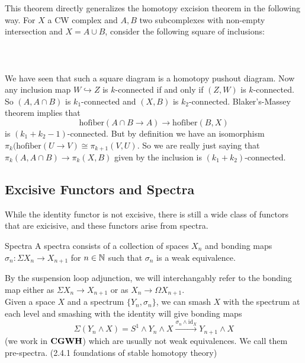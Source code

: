\documentclass[a4paper]{article}
\begin{document}
This theorem directly generalizes the homotopy excision theorem in the following way. For $X$ a CW complex and $A,B$ two subcomplexes with non-empty intersection and $X=A\cup B$, consider the following square of inclusions: \\~\\
\\~\\
We have seen that such a square diagram is a homotopy pushout diagram. Now any inclusion map $W\hookrightarrow Z$ is $k$-connected if and only if $(Z,W)$ is $k$-connected. So $(A,A\cap B)$ is $k_1$-connected and $(X,B)$ is $k_2$-connected. Blaker's-Massey theorem implies that $$\text{hofiber}(A\cap B\to A)\to\text{hofiber}(B,X)$$ is $(k_1+k_2-1)$-connected. But by definition we have an isomorphism $\pi_k(\text{hofiber}(U\to V)\cong\pi_{k+1}(V,U)$. So we are really just saying that $\pi_k(A,A\cap B)\to\pi_k(X,B)$ given by the inclusion is $(k_1+k_2)$-connected. 

\subsection{Excisive Functors and Spectra}
While the identity functor is not excisive, there is still a wide class of functors that are exicisive, and these functors arise from spectra. 

\begin{defn}{Spectra}{} A spectra consists of a collection of spaces $X_n$ and bonding maps $\sigma_n:\Sigma X_n\to X_{n+1}$ for $n\in\mathbb{N}$ such that $\sigma_n$ is a weak equivalence. 
\end{defn}

By the suspension loop adjunction, we will interchangably refer to the bonding map either as $\Sigma X_n\to X_{n+1}$ or as $X_n\to\Omega X_{n+1}$. \\

Given a space $X$ and a spectrum $\{Y_n,\sigma_n\}$, we can smash $X$ with the spectrum at each level and smashing with the identity will give bonding maps $$\Sigma(Y_n\wedge X)=S^1\wedge Y_n\wedge X\overset{\sigma_n\wedge\text{id}_X}{\to} Y_{n+1}\wedge X$$ (we work in $\bold{CGWH}$) which are usually not weak equivalences. We call them pre-spectra. (2.4.1 foundations of stable homotopy theory)
\end{document}
